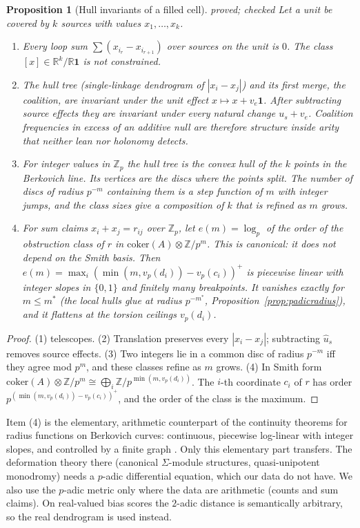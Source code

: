 \documentclass[11pt]{article}
\newtheorem{proposition}[theorem]{Proposition}
\theoremstyle{definition}
\theoremstyle{remark}
\newcommand{\Z}{\mathbb{Z}}
\newcommand{\R}{\mathbb{R}}
\newcommand{\st}[1]{\textsf{\small\color{gray}#1}}
\begin{document}
\begin{proposition}[Hull invariants of a filled cell]\label{prop:hull}\st{proved; checked}
Let a unit be covered by $k$ sources with values $x_1,\dots,x_k$.
\begin{enumerate}
  \item Every loop sum $\sum(x_{i_r}-x_{i_{r+1}})$ over sources on the unit is $0$. The class $[x]\in\R^k/\R\mathbf1$ is not constrained.
  \item The \emph{hull tree} (single-linkage dendrogram of $|x_i-x_j|$) and its first merge, the \emph{coalition}, are invariant under the unit effect $x\mapsto x+v_e\mathbf1$. After subtracting source effects they are invariant under every natural change $u_s+v_e$. Coalition frequencies in excess of an additive null are therefore structure inside arity that neither lean nor holonomy detects.
  \item For integer values in $\Z_p$ the hull tree is the convex hull of the $k$ points in the Berkovich line. Its vertices are the discs where the points split. The number of discs of radius $p^{-m}$ containing them is a step function of $m$ with integer jumps, and the class sizes give a composition of $k$ that is refined as $m$ grows.
  \item For sum claims $x_i+x_j=r_{ij}$ over $\Z_p$, let $e(m)=\log_p$ of the order of the obstruction class of $r$ in $\mathrm{coker}(A)\otimes\Z/p^m$. This is canonical: it does not depend on the Smith basis. Then $e(m)=\max_i(\min(m,v_p(d_i))-v_p(c_i))^+$ is piecewise linear with integer slopes in $\{0,1\}$ and finitely many breakpoints. It vanishes exactly for $m\le m^*$ (the local hulls glue at radius $p^{-m^*}$, Proposition~\ref{prop:padicradius}), and it flattens at the torsion ceilings $v_p(d_i)$.
\end{enumerate}
\end{proposition}
\begin{proof}
(1) telescopes. (2) Translation preserves every $|x_i-x_j|$; subtracting $\hat u_s$ removes source effects. (3) Two integers lie in a common disc of radius $p^{-m}$ iff they agree mod $p^m$, and these classes refine as $m$ grows. (4) In Smith form $\mathrm{coker}(A)\otimes\Z/p^m\cong\bigoplus_i\Z/p^{\min(m,v_p(d_i))}$. The $i$-th coordinate $c_i$ of $r$ has order $p^{(\min(m,v_p(d_i))-v_p(c_i))^+}$, and the order of the class is the maximum.
\end{proof}
\noindent Item (4) is the elementary, arithmetic counterpart of the continuity theorems for radius functions on Berkovich curves: continuous, piecewise log-linear with integer slopes, and controlled by a finite graph \cite{pulita}. Only this elementary part transfers. The deformation theory there (canonical $\Sigma$-module structures, quasi-unipotent monodromy) needs a $p$-adic differential equation, which our data do not have. We also use the $p$-adic metric only where the data are arithmetic (counts and sum claims). On real-valued bias scores the $2$-adic distance is semantically arbitrary, so the real dendrogram is used instead.
\end{document}

